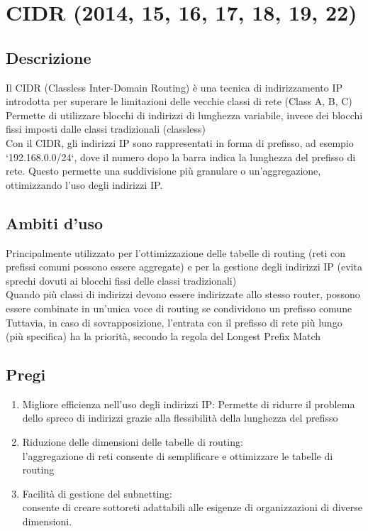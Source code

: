 \documentclass[10pt,oneside,a4paper]{article}
\begin{document}
\section{CIDR (2014, 15, 16, 17, 18, 19, 22)}
\subsection{Descrizione}
Il CIDR (Classless Inter-Domain Routing) è una tecnica di indirizzamento IP introdotta per superare le limitazioni delle vecchie classi di rete (Class A, B, C)\\
Permette di utilizzare blocchi di indirizzi di lunghezza variabile, invece dei blocchi fissi imposti dalle classi tradizionali (classless)\\
Con il CIDR, gli indirizzi IP sono rappresentati in forma di prefisso, ad esempio `192.168.0.0/24`, dove il numero dopo la barra indica la lunghezza del prefisso di rete. Questo permette una suddivisione più granulare o un'aggregazione, ottimizzando l'uso degli indirizzi IP.
\subsection{Ambiti d'uso}
Principalmente utilizzato per l'ottimizzazione delle tabelle di routing (reti con prefissi comuni possono essere aggregate) e per la gestione degli indirizzi IP (evita sprechi dovuti ai blocchi fissi delle classi tradizionali)\\
Quando più classi di indirizzi devono essere indirizzate allo stesso router, possono essere combinate in un'unica voce di routing se condividono un prefisso comune\\
Tuttavia, in caso di sovrapposizione, l'entrata con il prefisso di rete più lungo (più specifica) ha la priorità, secondo la regola del Longest Prefix Match
\subsection{Pregi}
\begin{enumerate}
\item Migliore efficienza nell'uso degli indirizzi IP: Permette di ridurre il problema dello spreco di indirizzi grazie alla flessibilità della lunghezza del prefisso
\item Riduzione delle dimensioni delle tabelle di routing: \\
l'aggregazione di reti consente di semplificare e ottimizzare le tabelle di routing
\item Facilità di gestione del subnetting:\\
consente di creare sottoreti adattabili alle esigenze di organizzazioni di diverse dimensioni.
\end{enumerate}
\end{document}
